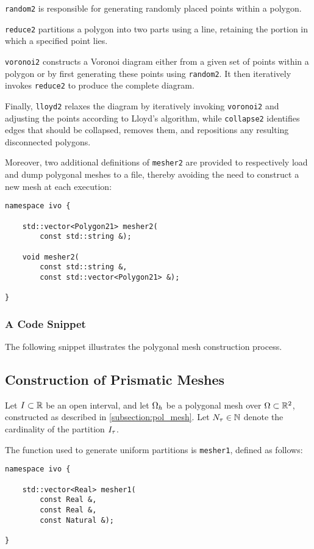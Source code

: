 \lstinline{random2} is responsible for generating randomly placed points within a polygon.

\lstinline{reduce2} partitions a polygon into two parts using a line, retaining the portion in which a specified point lies.

\lstinline{voronoi2} constructs a Voronoi diagram either from a given set of points within a polygon or by first generating these points using \lstinline{random2}. It then iteratively invokes \lstinline{reduce2} to produce the complete diagram.

Finally, \lstinline{lloyd2} relaxes the diagram by iteratively invoking \lstinline{voronoi2} and adjusting the points according to Lloyd's algorithm, while \lstinline{collapse2} identifies edges that should be collapsed, removes them, and repositions any resulting disconnected polygons.

\newpage
Moreover, two additional definitions of \lstinline{mesher2} are provided to respectively load and dump polygonal meshes to a file, thereby avoiding the need to construct a new mesh at each execution:
\begin{lstlisting}[style=cpp]
namespace ivo {

	std::vector<Polygon21> mesher2(
		const std::string &);

	void mesher2(
		const std::string &, 
		const std::vector<Polygon21> &);

}
\end{lstlisting}

\subsubsection{A Code Snippet}

The following snippet illustrates the polygonal mesh construction process.



\newpage
\subsection{Construction of Prismatic Meshes}

Let $I \subset \mathbb{R}$ be an open interval, and let $\Omega_{h}$ be a polygonal mesh over $\Omega \subset \mathbb{R}^{2}$, constructed as described in \cref{subsection:pol_mesh}. Let $N_{\tau} \in \mathbb{N}$ denote the cardinality of the partition $I_{\tau}$.

The function used to generate uniform partitions is \lstinline{mesher1}, defined as follows:
\begin{lstlisting}[style=cpp]
namespace ivo {

    std::vector<Real> mesher1(
        const Real &, 
        const Real &, 
        const Natural &);

}
\end{lstlisting}

